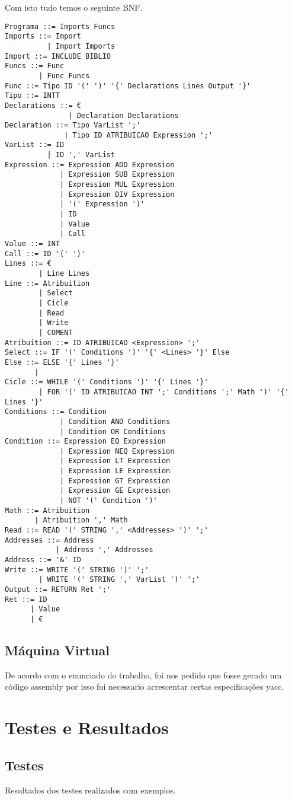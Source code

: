 \documentclass[12pt,a4paper]{report}
\begin{document}
 
Com isto tudo temos o seguinte BNF.

\begin{lstlisting}
Programa ::= Imports Funcs
Imports ::= Import
          | Import Imports
Import ::= INCLUDE BIBLIO
Funcs ::= Func
        | Func Funcs
Func ::= Tipo ID '(' ')' '{' Declarations Lines Output '}'
Tipo ::= INTT
Declarations ::= €
               | Declaration Declarations
Declaration ::= Tipo VarList ';'
              | Tipo ID ATRIBUICAO Expression ';'
VarList ::= ID
          | ID ',' VarList
Expression ::= Expression ADD Expression
             | Expression SUB Expression
             | Expression MUL Expression
             | Expression DIV Expression
             | '(' Expression ')'
             | ID
             | Value
             | Call
Value ::= INT
Call ::= ID '(' ')'
Lines ::= €
        | Line Lines
Line ::= Atribuition
        | Select
        | Cicle
        | Read
        | Write
        | COMENT
Atribuition ::= ID ATRIBUICAO <Expression> ';'
Select ::= IF '(' Conditions ')' '{' <Lines> '}' Else
Else ::= ELSE '{' Lines '}'
       | 
Cicle ::= WHILE '(' Conditions ')' '{' Lines '}'
        | FOR '(' ID ATRIBUICAO INT ';' Conditions ';' Math ')' '{' Lines '}'
Conditions ::= Condition
             | Condition AND Conditions
             | Condition OR Conditions
Condition ::= Expression EQ Expression
             | Expression NEQ Expression
             | Expression LT Expression
             | Expression LE Expression
             | Expression GT Expression
             | Expression GE Expression
             | NOT '(' Condition ')'
Math ::= Atribuition
       | Atribuition ',' Math
Read ::= READ '(' STRING ',' <Addresses> ')' ';'
Addresses ::= Address
            | Address ',' Addresses
Address ::= '&' ID
Write ::= WRITE '(' STRING ')' ';'
        | WRITE '(' STRING ',' VarList ')' ';'
Output ::= RETURN Ret ';'
Ret ::= ID
      | Value
      | €
\end{lstlisting}
\section{Máquina Virtual}
De acordo com o enunciado do trabalho, foi nos pedido que fosse gerado um código assembly por isso foi necessario acrescentar certas especificações yacc.

\chapter{Testes e Resultados}
\section{Testes}
Resultados dos testes realizados com exemplos.
\end{document}
